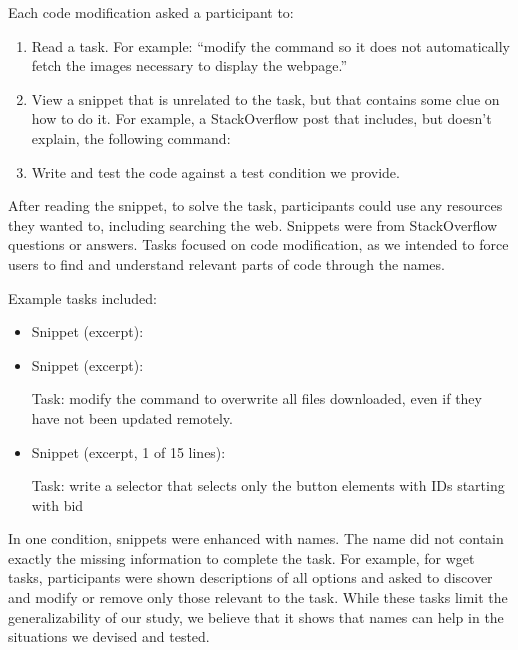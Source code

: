 \begin{changes}
Each code modification asked a participant to:
\begin{enumerate}
\item Read a task.  For example: ``modify the command so it does not automatically fetch the images necessary to display the webpage.''
\item View a snippet that is unrelated to the task, but that contains some clue on how to do it.  For example, a StackOverflow post that includes, but doesn't explain, the following command:
\item Write and test the code against a test condition we provide.
\end{enumerate}
After reading the snippet, to solve the task, participants could use any resources they wanted to, including searching the web.
Snippets were from StackOverflow questions or answers.
Tasks focused on code modification, as we intended to force users to find and understand relevant parts of code through the \glspl{name}.
\end{changes}
%
\begin{changes}
Example tasks included:
\begin{itemize}

\item
Snippet (excerpt):

\item
Snippet (excerpt):


Task: modify the command to overwrite all files downloaded, even if they have not been updated remotely.

\item

Snippet (excerpt, 1 of 15 lines):


Task: write a selector that selects only the button elements with IDs starting with bid

\end{itemize}
\fi

In one condition, snippets were enhanced with \Glspl{name}.
The \gls{name} did not contain exactly the missing information to complete the task.
For example, for wget tasks, participants were shown descriptions of all options and asked to discover and modify or remove only those relevant to the task.
While these tasks limit the generalizability of our study, we believe that it shows that \Glspl{name} can help in the situations we devised and tested.
\end{changes}


